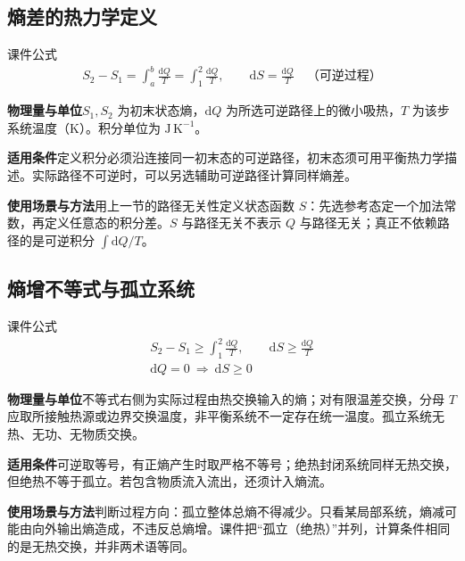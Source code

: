 \documentclass[UTF8,fontset=none,zihao=-4,a4paper]{ctexart}
\newcommand{\explain}[3]{\par\noindent\textbf{物理量与单位}\quad #1\par
\noindent\textbf{适用条件}\quad #2\par
\noindent\textbf{使用场景与方法}\quad #3\par}
\begin{document}
\par\noindent\begin{minipage}{\linewidth}
\subsection{熵差的热力学定义}
\begin{infobox}[breakable=false]{课件公式}
\begin{gather*}S_2-S_1=\int_a^b\frac{\mathrm dQ}T=\int_1^2\frac{\mathrm dQ}T,\qquad\mathrm dS=\frac{\mathrm dQ}T\quad\text{（可逆过程）}\end{gather*}
\end{infobox}
\end{minipage}\par
\explain{$S_1,S_2$ 为初末状态熵，$\mathrm dQ$ 为所选可逆路径上的微小吸热，$T$ 为该步系统温度（K）。积分单位为 $\mathrm{J\,K^{-1}}$。}{定义积分必须沿连接同一初末态的可逆路径，初末态须可用平衡热力学描述。实际路径不可逆时，可以另选辅助可逆路径计算同样熵差。}{用上一节的路径无关性定义状态函数 $S$：先选参考态定一个加法常数，再定义任意态的积分差。$S$ 与路径无关不表示 $Q$ 与路径无关；真正不依赖路径的是可逆积分 $\int\mathrm dQ/T$。}


\par\noindent\begin{minipage}{\linewidth}
\subsection{熵增不等式与孤立系统}
\begin{infobox}[breakable=false]{课件公式}
\begin{gather*}S_2-S_1\ge\int_1^2\frac{\mathrm dQ}T,\qquad\mathrm dS\ge\frac{\mathrm dQ}T\\\mathrm dQ=0\ \Longrightarrow\ \mathrm dS\ge0\end{gather*}
\end{infobox}
\end{minipage}\par
\explain{不等式右侧为实际过程由热交换输入的熵；对有限温差交换，分母 $T$ 应取所接触热源或边界交换温度，非平衡系统不一定存在统一温度。孤立系统无热、无功、无物质交换。}{可逆取等号，有正熵产生时取严格不等号；绝热封闭系统同样无热交换，但绝热不等于孤立。若包含物质流入流出，还须计入熵流。}{判断过程方向：孤立整体总熵不得减少。只看某局部系统，熵减可能由向外输出熵造成，不违反总熵增。课件把“孤立（绝热）”并列，计算条件相同的是无热交换，并非两术语等同。}
\end{document}
